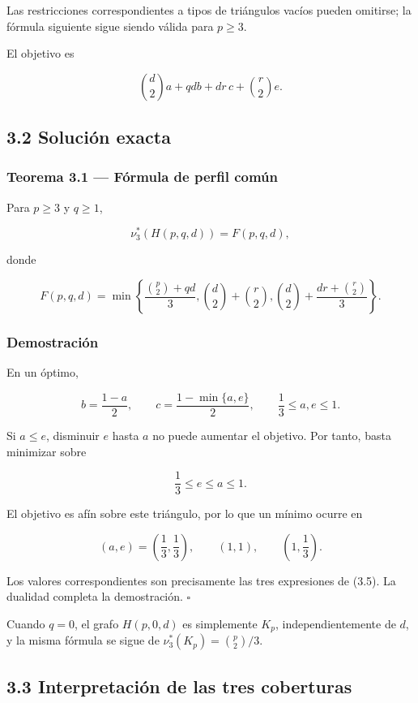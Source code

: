 \documentclass[
  11pt,
]{article}
\begin{document}
Las restricciones correspondientes a tipos de triángulos vacíos pueden omitirse; la fórmula siguiente sigue siendo válida para \(p\ge3\).

El objetivo es

\[
\binom d2a+qdb+dr\,c+\binom r2e.
\tag{3.3}
\]

\subsection{3.2 Solución exacta}\label{soluciuxf3n-exacta}

\subsubsection{Teorema 3.1 --- Fórmula de perfil común}\label{teorema-3.1-fuxf3rmula-de-perfil-comuxfan}

Para \(p\ge3\) y \(q\ge1\),

\[
\boxed{
\nu_3^*(H(p,q,d))
=
F(p,q,d),
}
\tag{3.4}
\]

donde

\[
\boxed{
F(p,q,d)
=
\min\left\{
\frac{\binom p2+qd}{3},
\binom d2+\binom r2,
\binom d2+\frac{dr+\binom r2}{3}
\right\}.
}
\tag{3.5}
\]

\subsubsection{Demostración}\label{demostraciuxf3n}

En un óptimo,

\[
b=\frac{1-a}{2},
\qquad
c=\frac{1-\min\{a,e\}}2,
\qquad
\frac13\le a,e\le1.
\]

Si \(a\le e\), disminuir \(e\) hasta \(a\) no puede aumentar el objetivo. Por tanto, basta minimizar sobre

\[
\frac13\le e\le a\le1.
\]

El objetivo es afín sobre este triángulo, por lo que un mínimo ocurre en

\[
(a,e)=\left(\frac13,\frac13\right),
\qquad
(1,1),
\qquad
\left(1,\frac13\right).
\]

Los valores correspondientes son precisamente las tres expresiones de (3.5). La dualidad completa la demostración. \(\square\)

Cuando \(q=0\), el grafo \(H(p,0,d)\) es simplemente \(K_p\), independientemente de \(d\), y la misma fórmula se sigue de \(\nu_3^*(K_p)=\binom p2/3\).

\subsection{3.3 Interpretación de las tres coberturas}\label{interpretaciuxf3n-de-las-tres-coberturas}
\end{document}
